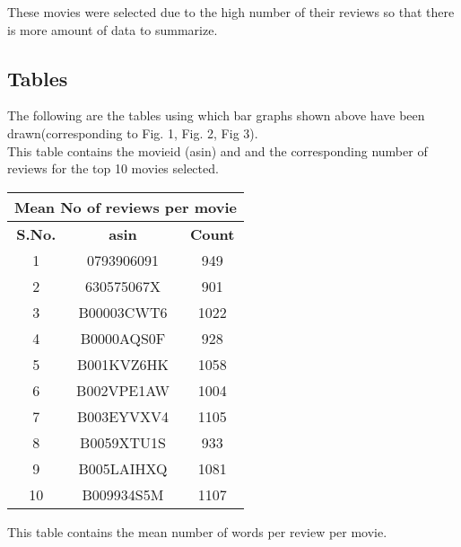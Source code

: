 \documentclass[conference]{IEEEtran}
\begin{document}
These movies were selected due to the high number of their reviews so that there is more amount of data to summarize.

\subsection{Tables}

The following are the tables using which bar graphs shown above have been drawn(corresponding to Fig. 1, Fig. 2, Fig 3).\\

This table contains the movieid (asin) and and the corresponding number of reviews for the top 10 movies selected. \\

\begin{center}
 \begin{tabular}{|c | c | c|} 
 \hline
 \multicolumn{3}{|c|}{Mean No of reviews per movie} \\
 \hline
 \bfseries S.No. & \bfseries asin & \bfseries Count \\ [0.5ex] 
 \hline
 1 & 0793906091 & 949\\ 
 \hline
 2 & 630575067X & 901\\
 \hline
 3 & B00003CWT6 & 1022\\
 \hline
 4 & B0000AQS0F & 928\\
 \hline
 5 & B001KVZ6HK & 1058\\ 
 \hline
 6 & B002VPE1AW & 1004\\ 
 \hline
 7 & B003EYVXV4 & 1105\\
 \hline
 8 & B0059XTU1S & 933\\
 \hline
 9 & B005LAIHXQ & 1081\\
 \hline
 10 & B009934S5M & 1107\\[1ex] 
 \hline
\end{tabular}
\end{center}
\vspace{8mm}

This table contains the mean number of words per review per movie.\\
\end{document}
